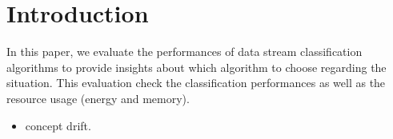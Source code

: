 \section{Introduction}
\label{sec:introduction}

In this paper, we evaluate the performances of
data stream classification algorithms to provide
insights about which algorithm to choose regarding
the situation.
This evaluation check the classification
performances as well as the resource usage (energy
and memory).

\begin{itemize}
		\item concept drift.
\end{itemize}





